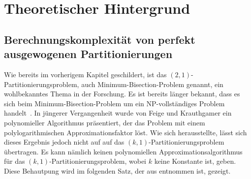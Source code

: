 
\newcommand{\apxalg}{\mathcal{A}}
\newcommand{\oset}[2]{%
    \tikz[baseline=(X.base),inner sep=0pt,outer sep=0pt]{%
        \node[inner sep=0pt,outer sep=0pt] (X) {$#2$}; 
            \node[yshift=1pt] at (X.north) {$#1$};
    }
}
\newcommand{\calS}{\mathcal{S}}
\newcommand{\bbS}{\mathbb{S}}
\newcommand{\tildaS}{\oset{\ \scriptstyle\sim}{\calS}}
\newcommand{\calL}{\mathcal{L}}
\newcommand{\calV}{\mathcal{V}}

\chapter{Theoretischer Hintergrund}\label{chapter:theorie}
\section{Berechnungskomplexität von perfekt ausgewogenen Partitionierungen }
Wie bereits im vorherigem Kapitel geschildert, ist das $(2,1)$\hyp Partitionierungsproblem, auch  Minimum-Bisection-Problem genannt, ein wohlbekanntes Thema in der Forschung. 
Es ist bereits länger bekannt, dass es sich beim Minimum-Bisection-Problem um ein NP-vollständiges Problem handelt~\parencite{gj79}.
In jüngerer Vergangenheit wurde von Feige und Krauthgamer ein polynomieller Algorithmus präsentiert, der das Problem mit einem polylogarithmischen Approximationsfaktor löst. \parencite{fk02}
Wie sich herausstellte, lässt sich dieses Ergebnis jedoch nicht auf auf das $(k,1)$\hyp Partitionierungsproblem übertragen.
Es kann nämlich keinen polynomiellen Approximationsalgorithmus für das $(k,1)$\hyp Partitionierungsproblem, wobei $k$ keine Konstante ist, geben.
Diese Behautpung wird im folgenden Satz, der aus \parencite{ar06} entnommen ist, gezeigt. \\

